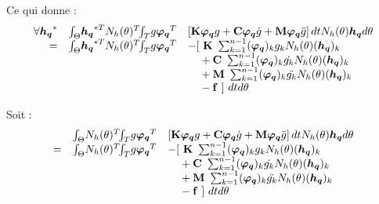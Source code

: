 \documentclass[12pt,a4paper]{report}
\begin{document}
Ce qui donne :
\begin{equation}
\begin{array}{r r l}
	\forall \boldsymbol{h_q}^*
	&\int_\Theta \!  \boldsymbol{h_q}^{*T} N_h(\theta)^{T}  \!\! \int_T \! g \boldsymbol{\varphi_q}^T &
						\left[  \mathbf{K} \boldsymbol{\varphi_q}g
							+ \mathbf{C} \boldsymbol{\varphi_q} \dot{g}
							+ \mathbf{M} \boldsymbol{\varphi_q} \ddot{g}
						\right] dt  N_h(\theta) \boldsymbol{h_q} d\theta
	\\ = &\int_\Theta \!  \boldsymbol{h_q}^{*T} N_h(\theta)^{T}  \!\! \int_T \! g \boldsymbol{\varphi_q}^T &
	  		-[~ \mathbf{K}~ \sum_{k=1}^{n-1} (\boldsymbol{\varphi_q})_k       g_k N_h(\theta) (\boldsymbol{h_q})_k 
	  \\&& \phantom{-[}
			+ \mathbf{C}~ \sum_{k=1}^{n-1} (\boldsymbol{\varphi_q})_k  \dot{g_k} N_h(\theta) (\boldsymbol{h_q})_k 
	  \\&& \phantom{-[}
			+ \mathbf{M}~ \sum_{k=1}^{n-1} (\boldsymbol{\varphi_q})_k \ddot{g_k} N_h(\theta) (\boldsymbol{h_q})_k
	  \\&& \phantom{-[}
			-\mathbf{f}~] ~dt d\theta 
\end{array}
\end{equation}

Soit :
\begin{equation}
\begin{array}{r r l}
	&\int_\Theta \!  N_h(\theta)^{T}  \!\! \int_T \! g \boldsymbol{\varphi_q}^T &
						\left[  \mathbf{K} \boldsymbol{\varphi_q}g
							+ \mathbf{C} \boldsymbol{\varphi_q} \dot{g}
							+ \mathbf{M} \boldsymbol{\varphi_q} \ddot{g}
						\right] dt  N_h(\theta) \boldsymbol{h_q} d\theta
	\\ = &\int_\Theta \!  N_h(\theta)^{T}  \!\! \int_T \! g \boldsymbol{\varphi_q}^T &
	  		-[~ \mathbf{K}~ \sum_{k=1}^{n-1} (\boldsymbol{\varphi_q})_k       g_k N_h(\theta) (\boldsymbol{h_q})_k 
	  \\&& \phantom{-[}
			+ \mathbf{C}~ \sum_{k=1}^{n-1} (\boldsymbol{\varphi_q})_k  \dot{g_k} N_h(\theta) (\boldsymbol{h_q})_k 
	  \\&& \phantom{-[}
			+ \mathbf{M}~ \sum_{k=1}^{n-1} (\boldsymbol{\varphi_q})_k \ddot{g_k} N_h(\theta) (\boldsymbol{h_q})_k
	  \\&& \phantom{-[}
			-\mathbf{f}~] ~dt d\theta 
\end{array}
\end{equation}
  
\end{document}
